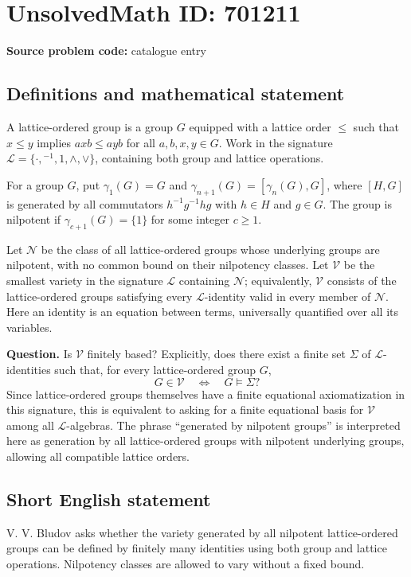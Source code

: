 \documentclass[11pt]{article}
\begin{document}
\section*{UnsolvedMath ID: 701211}
\textbf{Source problem code:} catalogue entry
\subsection{Definitions and mathematical statement}
A lattice-ordered group is a group \(G\) equipped with a lattice order \(\leq\) such that \(x\leq y\) implies \(axb\leq ayb\) for all \(a,b,x,y\in G\). Work in the signature \(\mathcal L=\{\cdot,{}^{-1},1,\wedge,\vee\}\), containing both group and lattice operations.

For a group \(G\), put \(\gamma_1(G)=G\) and \(\gamma_{n+1}(G)=[\gamma_n(G),G]\), where \([H,G]\) is generated by all commutators \(h^{-1}g^{-1}hg\) with \(h\in H\) and \(g\in G\). The group is nilpotent if \(\gamma_{c+1}(G)=\{1\}\) for some integer \(c\geq1\).

Let \(\mathcal N\) be the class of all lattice-ordered groups whose underlying groups are nilpotent, with no common bound on their nilpotency classes. Let \(\mathcal V\) be the smallest variety in the signature \(\mathcal L\) containing \(\mathcal N\); equivalently, \(\mathcal V\) consists of the lattice-ordered groups satisfying every \(\mathcal L\)-identity valid in every member of \(\mathcal N\). Here an identity is an equation between terms, universally quantified over all its variables.

\textbf{Question.} Is \(\mathcal V\) finitely based? Explicitly, does there exist a finite set \(\Sigma\) of \(\mathcal L\)-identities such that, for every lattice-ordered group \(G\),
\[
G\in\mathcal V\quad\Longleftrightarrow\quad G\models\Sigma?
\]
Since lattice-ordered groups themselves have a finite equational axiomatization in this signature, this is equivalent to asking for a finite equational basis for \(\mathcal V\) among all \(\mathcal L\)-algebras. The phrase ``generated by nilpotent groups'' is interpreted here as generation by all lattice-ordered groups with nilpotent underlying groups, allowing all compatible lattice orders.
\subsection{Short English statement}
V. V. Bludov asks whether the variety generated by all nilpotent lattice-ordered groups can be defined by finitely many identities using both group and lattice operations. Nilpotency classes are allowed to vary without a fixed bound.
\end{document}
